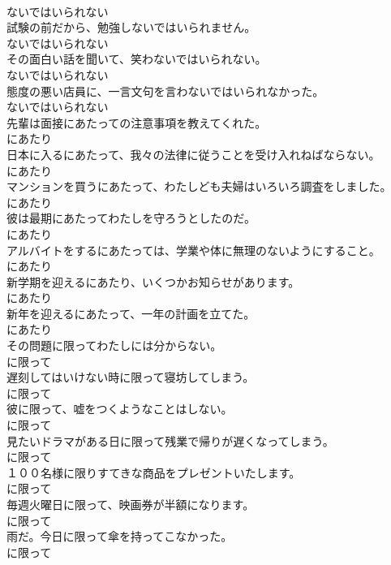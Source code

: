 \documentclass[8pt]{extreport}
\begin{document}
\begin{CJK}{UTF8}{min}
\\	ないではいられない	
\\	試験の前だから、勉強しないではいられません。	
\\	ないではいられない	
\\	その面白い話を聞いて、笑わないではいられない。	
\\	ないではいられない	
\\	態度の悪い店員に、一言文句を言わないではいられなかった。	
\\	ないではいられない	
\\	先輩は面接にあたっての注意事項を教えてくれた。	
\\	にあたり	
\\	日本に入るにあたって、我々の法律に従うことを受け入れねばならない。	
\\	にあたり	
\\	マンションを買うにあたって、わたしども夫婦はいろいろ調査をしました。	
\\	にあたり	
\\	彼は最期にあたってわたしを守ろうとしたのだ。	
\\	にあたり	
\\	アルバイトをするにあたっては、学業や体に無理のないようにすること。	
\\	にあたり	
\\	新学期を迎えるにあたり、いくつかお知らせがあります。	
\\	にあたり	
\\	新年を迎えるにあたって、一年の計画を立てた。	
\\	にあたり	
\\	その問題に限ってわたしには分からない。	
\\	に限って	
\\	遅刻してはいけない時に限って寝坊してしまう。	
\\	に限って	
\\	彼に限って、嘘をつくようなことはしない。	
\\	に限って	
\\	見たいドラマがある日に限って残業で帰りが遅くなってしまう。	
\\	に限って	
\\	１００名様に限りすてきな商品をプレゼントいたします。	
\\	に限って	
\\	毎週火曜日に限って、映画券が半額になります。	
\\	に限って	
\\	雨だ。今日に限って傘を持ってこなかった。	
\\	に限って	

\end{CJK}
\end{document}
